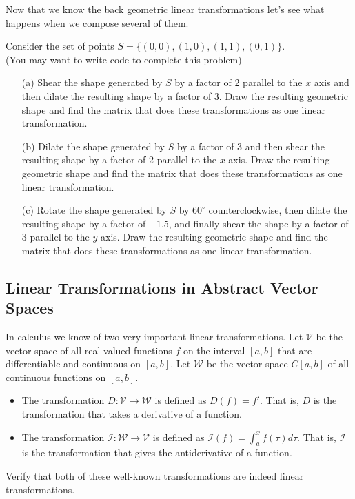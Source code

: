Now that we know the back geometric linear transformations let's see what happens when we
compose several of them.  
\begin{problem}
    Consider the set of points $S = \{(0,0),(1,0),(1,1),(0,1)\}$.  \\(You may want to
    write code to complete this problem)
    \begin{enumerate}
        \item[(a)] Shear the shape generated by $S$ by a factor of 2 parallel to the $x$
            axis and then dilate the resulting shape by a factor of 3.  Draw the resulting
            geometric shape and find the matrix that does these transformations as one
            linear transformation.
        \item[(b)] Dilate the shape generated by $S$ by a factor of 3 and then shear the
            resulting shape by a factor of 2 parallel to the $x$
            axis.  Draw the resulting
            geometric shape and find the matrix that does these transformations as one
            linear transformation.
        \item[(c)] Rotate the shape generated by $S$ by $60^\circ$ counterclockwise, then
            dilate the resulting shape by a factor of $-1.5$, and finally shear the shape
            by a factor of 3 parallel to the $y$ axis.  Draw the resulting
            geometric shape and find the matrix that does these transformations as one
            linear transformation.
    \end{enumerate}
\end{problem}



\subsection{Linear Transformations in Abstract Vector Spaces}
\begin{problem}\label{prob:calc_lt}
    In calculus we know of two very important linear transformations.  Let $\mathcal{V}$
    be the vector space of all real-valued functions $f$ on the interval $[a,b]$ that are
    differentiable and continuous on $[a,b]$.  Let $\mathcal{W}$ be the vector space
    $C[a,b]$ of all continuous functions on $[a,b]$.  
    \begin{itemize}
        \item The transformation $D: \mathcal{V} \to \mathcal{W}$ is defined as $D(f) =
            f'$.  That is, $D$ is the transformation that takes a derivative of a
            function.
        \item The transformation $\mathcal{I}: \mathcal{W} \to \mathcal{V}$ is defined as
            $\mathcal{I}(f) = \int_a^x f(\tau) d\tau$.  That is, $\mathcal{I}$ is the
            transformation that gives the antiderivative of a function.
    \end{itemize}
    Verify that both of these well-known transformations are indeed linear
    transformations.
\end{problem}

